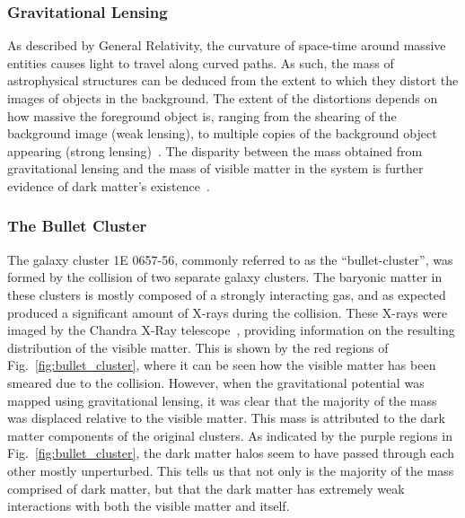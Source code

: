 \subsubsection*{Gravitational Lensing}

As described by General Relativity, the curvature of space-time around massive entities causes light to travel along curved paths. 
As such, the mass of astrophysical structures can be deduced from the extent to which they distort the images of objects in the background. The extent of the distortions depends on how massive the foreground object is, ranging from the shearing of the background image (weak lensing), to multiple copies of the background object appearing (strong lensing)~\cite{Schneider_Gravitationallensingstrong}.  The disparity between the mass obtained from gravitational lensing and the mass of visible matter in the system is further evidence of dark matter's existence~\cite{SDSS:2005sxd_FourthDataRelease, Mandelbaum:2005nx_Galaxyhalomasses}. 

\subsubsection*{The Bullet Cluster}
The galaxy cluster 1E 0657-56, commonly referred to as the ``bullet-cluster'', was formed by the collision of two separate galaxy clusters. 
The baryonic matter in these clusters is mostly composed of a strongly interacting gas, and as expected produced a significant amount of X-rays during the collision. These X-rays were imaged by the Chandra X-Ray telescope~\cite{Clowe:2003tk_Weaklensingmass}, providing information on the resulting distribution of the visible matter. This is shown by the red regions of Fig.~\ref{fig:bullet_cluster}, where it can be seen how the visible matter has been smeared due to the collision. 
However, when the gravitational potential was mapped using gravitational lensing, it was clear that the majority of the mass was displaced relative to the visible matter. This mass is attributed to the dark matter components of the original clusters. As indicated by the purple regions in Fig.~\ref{fig:bullet_cluster}, the dark matter halos seem to have passed through each other mostly unperturbed. This tells us that not only is the majority of the mass comprised of dark matter, but that the dark matter has extremely weak interactions with both the visible matter and itself. 


